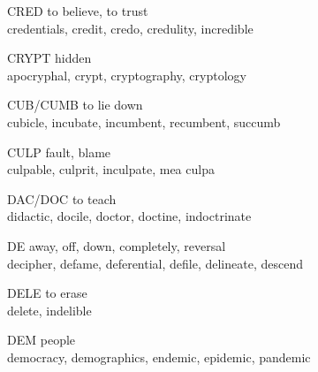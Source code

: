\begin{flashcard}[Roots]{CRED}
to believe, to trust\\
\vspace{0.2in}
credentials, credit, credo, credulity, incredible\\
\end{flashcard}

\begin{flashcard}[Roots]{CRYPT}
 hidden\\
\vspace{0.2in}
apocryphal, crypt, cryptography, cryptology\\
\end{flashcard}

\begin{flashcard}[Roots]{CUB/CUMB}
to lie down\\
\vspace{0.2in}
cubicle, incubate, incumbent, recumbent, succumb\\
\end{flashcard}

\begin{flashcard}[Roots]{CULP}
fault, blame\\
\vspace{0.2in}
culpable, culprit, inculpate, mea culpa\\
\end{flashcard}

\begin{flashcard}[Roots]{DAC/DOC}
to teach\\
\vspace{0.2in}
didactic, docile, doctor, doctine, indoctrinate\\
\end{flashcard}

\begin{flashcard}[Roots]{DE}
away, off, down, completely, reversal\\
\vspace{0.2in}
decipher, defame, deferential, defile, delineate, descend\\
\end{flashcard}

\begin{flashcard}[Roots]{DELE}
to erase\\
\vspace{0.2in}
delete, indelible\\
\end{flashcard}

\begin{flashcard}[Roots]{DEM}
people\\
\vspace{0.2in}
democracy, demographics, endemic, epidemic, pandemic\\
\end{flashcard}

